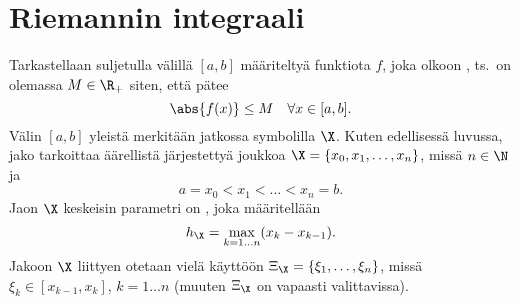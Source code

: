 \section{Riemannin integraali} \label{riemannin integraali}
\alku
{}

Tarkastellaan suljetulla välillä $[a,b]$ määriteltyä funktiota $f$, joka olkoon 
%
, ts.\ on olemassa $M\in\R_+$ siten, että pätee
\[
\abs{f(x)}\leq M\quad\forall x\in [a,b].
\]
Välin $[a,b]$ yleistä 
%
 merkitään jatkossa symbolilla $\X$. Kuten edellisessä luvussa,
jako tarkoittaa äärellistä järjestettyä joukkoa $\X=\{x_0,x_1,\ldots,x_n\}$, missä 
$n\in\N$ ja
\[
a=x_0<x_1<\ldots <x_n=b.
\]
Jaon $\X$ keskeisin parametri on
%
, joka määritellään
\[
h_{\X}=\max_{k=1\ldots n} (x_k-x_{k-1}).
\]
Jakoon $\X$ liittyen otetaan vielä käyttöön 
%
 $\Xi_\X=\{\xi_1,\ldots,\xi_n\}$,
missä $\xi_k\in [x_{k-1},x_k]$, $k=1\ldots n$ (muuten $\Xi_\X$ on vapaasti valittavissa).

